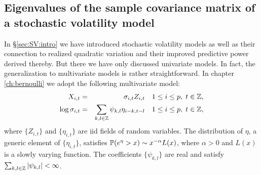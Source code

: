 

\subsection{Eigenvalues of the sample covariance matrix of a   
  stochastic volatility model}
In \S\ref{sec:SV:intro} we have introduced stochastic volatility
models as well as their connection to realized quadratic
variation and their improved predictive power derived thereby. But
there we have only discussed univariate models. In fact, the
generalization to multivariate models is rather straightforward. In
chapter \ref{ch:bernoulli} we adopt the following multivariate model:
\begin{eqnarray*}
  X_{i,t} &=& \sigma_{i,t} Z_{i,t} \quad
  1 \leq i \leq p,\;
  t \in \integers, \\
  \log \sigma_{i, t}
  &=&
  \sum_{k,l \in \integers} \psi_{k,l} \eta_{i-k, t-l}\quad
  1 \leq i \leq p,\;
  t \in \integers,
\end{eqnarray*}
where $\{Z_{i,t}\}$ and $\{\eta_{i,t}\}$ are iid fields of random
variables. The distribution of $\eta$, a generic element of
$\{\eta_{i,t}\}$, satisfies $\P(e^\eta > x) \sim x^{-\alpha} L(x)$,
where $\alpha > 0$ and $L(x)$ is a slowly varying function. The
coefficients $\{\psi_{k,l}\}$ are real and satisfy
$\sum_{k, l \in \integers} |\psi_{k,l}| < \infty$.

